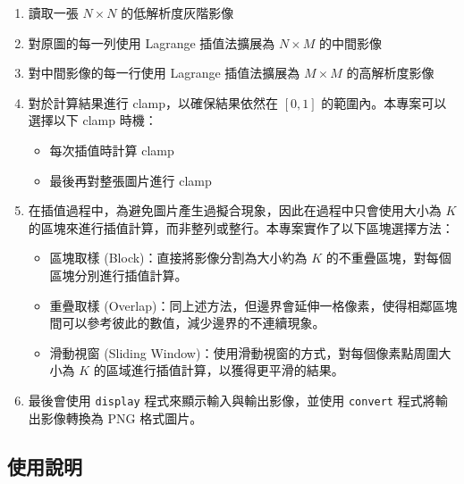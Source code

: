 \documentclass[a4paper,  10pt, oneside, fleqn]{article}
\begin{document}
\begin{enumerate}
    \item 讀取一張 $N \times N$ 的低解析度灰階影像
    \item 對原圖的每一列使用 Lagrange 插值法擴展為 $N \times M$ 的中間影像
    \item 對中間影像的每一行使用 Lagrange 插值法擴展為 $M \times M$ 的高解析度影像
    \item 對於計算結果進行 clamp，以確保結果依然在 $[0, 1]$ 的範圍內。本專案可以選擇以下 clamp 時機：
          \begin{itemize}
              \item 每次插值時計算 clamp
              \item 最後再對整張圖片進行 clamp
          \end{itemize}
    \item 在插值過程中，為避免圖片產生過擬合現象，因此在過程中只會使用大小為 $K$ 的區塊來進行插值計算，而非整列或整行。本專案實作了以下區塊選擇方法：
          \begin{itemize}
              \item 區塊取樣 (Block)：直接將影像分割為大小約為 $K$ 的不重疊區塊，對每個區塊分別進行插值計算。
              \item 重疊取樣 (Overlap)：同上述方法，但邊界會延伸一格像素，使得相鄰區塊間可以參考彼此的數值，減少邊界的不連續現象。
              \item 滑動視窗 (Sliding Window)：使用滑動視窗的方式，對每個像素點周圍大小為 $K$ 的區域進行插值計算，以獲得更平滑的結果。
          \end{itemize}
    \item 最後會使用 \lstinline|display| 程式來顯示輸入與輸出影像，並使用 \lstinline|convert| 程式將輸出影像轉換為 PNG 格式圖片。
\end{enumerate}

\subsection*{使用說明}
\end{document}
